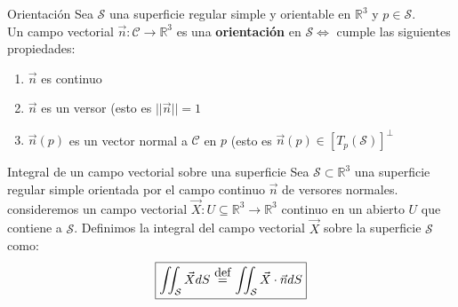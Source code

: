 \documentclass{report}
\newcommand\defeq{\stackrel{\mathclap{\normalfont\mbox{def}}}{~=~}}
\newcommand\reals{\mathds{R}}
\begin{document}
\begin{defbox}{Orientación}
	Sea $\mathcal{S}$ una superficie regular simple y orientable en $\reals^3$ y $p \in \mathcal{S}$.\\
	Un campo vectorial $\vec{n} : \mathcal{C} \rightarrow \reals^3$ es una \textbf{orientación} en $\mathcal{S} \iff$ cumple las siguientes propiedades:
	\begin{enumerate}
		\item $\vec{n}$ es continuo
		\item $\vec{n}$ es un versor (esto es $||\vec{n}|| = 1$
		\item $\vec{n} (p)$ es un vector normal a $\mathcal{C}$ en $p$ (esto es $\vec{n}(p)\in [T_p(\mathcal{S})]^\bot$
	\end{enumerate}
\end{defbox}

\begin{defbox}{Integral de un campo vectorial sobre una superficie}
	Sea $\mathcal{S} \subset \reals^3$ una superficie regular simple orientada por el campo continuo $\vec{n}$ de versores normales.
	consideremos un campo vectorial $\vec{X} : U \subseteq \reals^3 \rightarrow \reals^3$ continuo en un abierto $U$ que contiene a $\mathcal{S}$.
	Definimos la integral del campo vectorial $\vec{X}$ sobre la superficie $\mathcal{S}$ como:
	\begin{equation}
		\boxed{
			\iint_{\mathcal{S}}{\vec{X}dS} \defeq \iint_{\mathcal{S}}{\vec{X}\cdot \vec{n}dS}
		}
		\label{eq:int_s_vec}
	\end{equation}
\end{defbox}
\end{document}
